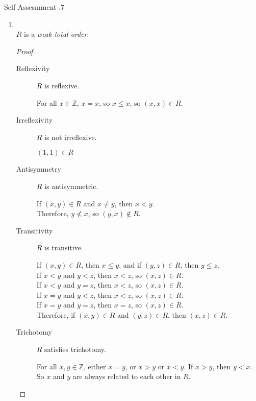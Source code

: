 \documentclass[\main/notes.tex]{subfiles}
\begin{document}
\begin{exercise}{Self Assesmment \thechapter.7}
\begin{enumerate}
						\item {}\\
							$R$ is a \emph{weak total order}.
							\begin{proof}
								$ $
								\begin{description}
									\item[Reflexivity] $R$ is reflexive.
										\begin{subproof}
											For all $x \in \mathbb{Z}$, $x = x$, so $x \leq x$, so $(x, x) \in R$.
										\end{subproof}
									\item[Irreflexivity] $R$ is not irreflexive.
										\begin{subproof}[Counterexample]
											$(1, 1) \in R$
										\end{subproof}
									\item[Antisymmetry] $R$ is antisymmetric.
										\begin{subproof}
											If $(x, y) \in R$ and $x \neq y$, then $x < y$.\\
											Therefore, $y \not < x$, so $(y, x) \notin R$.
										\end{subproof}
									\pagebreak
									\item[Transitivity] $R$ is transitive.
										\begin{subproof}
											If $(x, y) \in R$, then $x \leq y$, and
											if $(y, z) \in R$, then $y \leq z$.\\
											If $x < y$ and $y < z$, then $x < z$, so $(x, z) \in R$.\\
											If $x < y$ and $y = z$, then $x < z$, so $(x, z) \in R$.\\
											If $x = y$ and $y < z$, then $x < z$, so $(x, z) \in R$.\\
											If $x = y$ and $y = z$, then $x = z$, so $(x, z) \in R$.\\
											Therefore, if $(x, y) \in R$ and $(y, z) \in R$, then $(x, z) \in R$. 
										\end{subproof}
									\item[Trichotomy] $R$ satisfies trichotomy.
										\begin{subproof}
											For all $x, y \in \mathbb{Z}$, either $x = y$, or $x > y$ or $x < y$. If $x > y$, then $y < x$. So $x$ and $y$ are always related to each other in $R$.
										\end{subproof}
								\end{description}

\end{proof}
\end{enumerate}
\end{exercise}
\end{document}
